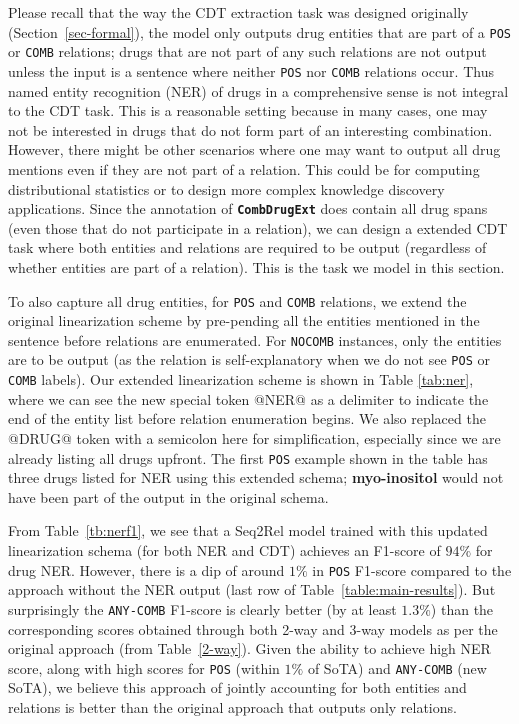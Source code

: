 \documentclass[conference]{IEEEtran}
\begin{document}
Please recall that the way the CDT extraction task was designed originally (Section~\ref{sec-formal}), the model only outputs drug entities that are part of a \texttt{POS} or \texttt{COMB} relations; drugs that are not part of any such relations are not output unless the input is a sentence where neither \texttt{POS} nor \texttt{COMB} relations occur. Thus named entity recognition (NER) of drugs in a comprehensive sense is not integral to the CDT task. This is a reasonable setting because in many cases, one may not be interested in drugs that do not form part of an interesting combination. However, there might be other scenarios where one may want to output all drug mentions even if they are not part of a relation. This could be for computing distributional statistics or to design more complex knowledge discovery applications. Since the annotation of \textbf{\texttt{CombDrugExt}} does contain all drug spans (even those that do not participate in a relation), we can design a extended CDT task where both entities and relations are required to be output (regardless of whether entities are part of a relation). This is the task we model in this section.

To also capture all drug entities, for \texttt{POS} and \texttt{COMB} relations, we extend the original linearization scheme by pre-pending all the entities mentioned in the sentence before relations are enumerated. For \texttt{NOCOMB} instances, only the entities are to be output (as the relation is self-explanatory when we do not see \texttt{POS} or \texttt{COMB} labels). Our extended   linearization scheme is shown in Table \ref{tab:ner}, where we can see the new special token @NER@ as a delimiter to indicate the end of the entity list before relation enumeration begins. We also replaced the @DRUG@ token with a semicolon here for simplification, especially since we are already listing all drugs upfront. The first \texttt{POS} example shown in the table has three drugs listed for NER using this extended schema;  \textbf{myo-inositol} would not have been part of the output in the original schema. 



From Table~\ref{tb:nerf1}, we see that a Seq2Rel model trained with this updated linearization schema (for both NER and CDT) achieves an F1-score of $94\%$ for drug NER.  
However, there is a dip of around $1\%$ in \texttt{POS} F1-score compared to the approach without the NER output (last row of Table~\ref{table:main-results}). But surprisingly the \texttt{ANY-COMB} F1-score is clearly better (by at least $1.3\%$) than the corresponding scores obtained through both 2-way and 3-way models as per the original approach (from Table~\ref{2-way}). Given the ability to achieve high NER score, along with high scores for \texttt{POS} (within $1\%$ of SoTA) and \texttt{ANY-COMB} (new SoTA), we believe this approach of jointly accounting for both entities and relations is better than the original approach that outputs only relations. 
\end{document}
